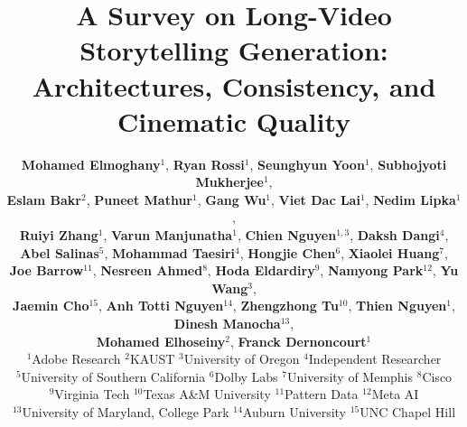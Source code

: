 \documentclass[10pt,twocolumn,letterpaper]{article}
\title{A Survey on Long-Video Storytelling Generation: \\Architectures, Consistency, and Cinematic Quality}
\author{%
  \textbf{Mohamed Elmoghany}$^{1}$,
  \textbf{Ryan Rossi}$^{1}$,
  \textbf{Seunghyun Yoon}$^{1}$,
  \textbf{Subhojyoti Mukherjee}$^{1}$,\\
  \textbf{Eslam Bakr}$^{2}$,
  \textbf{Puneet Mathur}$^{1}$,
  \textbf{Gang Wu}$^{1}$,
  \textbf{Viet Dac Lai}$^{1}$,
  \textbf{Nedim Lipka}$^{1}$,\\
  \textbf{Ruiyi Zhang}$^{1}$,
  \textbf{Varun Manjunatha}$^{1}$,
  \textbf{Chien Nguyen}$^{1,3}$,
  \textbf{Daksh Dangi}$^{4}$,\\
  \textbf{Abel Salinas}$^{5}$,
  \textbf{Mohammad Taesiri}$^{4}$,
  \textbf{Hongjie Chen}$^{6}$,
  \textbf{Xiaolei Huang}$^{7}$,\\
  \textbf{Joe Barrow}$^{11}$,
  \textbf{Nesreen Ahmed}$^{8}$,
  \textbf{Hoda Eldardiry}$^{9}$,
  \textbf{Namyong Park}$^{12}$,
  \textbf{Yu Wang}$^{3}$,\\
  \textbf{Jaemin Cho}$^{15}$,
  \textbf{Anh Totti Nguyen}$^{14}$,
  \textbf{Zhengzhong Tu}$^{10}$,
  \textbf{Thien Nguyen}$^{1}$,
  \textbf{Dinesh Manocha}$^{13}$,\\
  \textbf{Mohamed Elhoseiny}$^{2}$,
  \textbf{Franck Dernoncourt}$^{1}$\\[1ex]
  $^{1}$Adobe Research \quad
  $^{2}$KAUST \quad
  $^{3}$University of Oregon \quad
  $^{4}$Independent Researcher \quad\\
  $^{5}$University of Southern California \quad
  $^{6}$Dolby Labs \quad
  $^{7}$University of Memphis \quad
  $^{8}$Cisco \quad\\
  $^{9}$Virginia Tech \quad
  $^{10}$Texas A\&M University \quad
  $^{11}$Pattern Data \quad
  $^{12}$Meta AI \quad\\
  $^{13}$University of Maryland, College Park \quad
  $^{14}$Auburn University \quad
  $^{15}$UNC Chapel Hill
}
\begin{document}
\maketitle

    








{\small
    
    
}

\clearpage
\appendix
 
\end{document}

